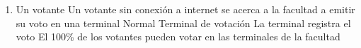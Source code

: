 \begin{enumerate}
\medskip
\item   {}
{Un votante}
{Un votante sin conexión a internet se acerca a la facultad a emitir su voto en una terminal}
{Normal}
{Terminal de votaci\'on}
{La terminal registra el voto}
{El 100\% de los votantes pueden votar en las terminales de la facultad}


\end{enumerate}
